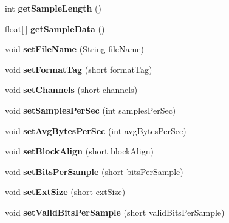 \begin{DoxyCompactItemize}
\item 
\hypertarget{classSample_af37225c7e2ac53d7e0e34a24e80dba47}{int {\bfseries get\-Sample\-Length} ()}\label{classSample_af37225c7e2ac53d7e0e34a24e80dba47}

\item 
\hypertarget{classSample_a97254a39cf9d058d845b044ed42dc11b}{float\mbox{[}$\,$\mbox{]} {\bfseries get\-Sample\-Data} ()}\label{classSample_a97254a39cf9d058d845b044ed42dc11b}

\item 
\hypertarget{classSample_abe334dfc32a4d11c31af3bee72b2f2c9}{void {\bfseries set\-File\-Name} (String file\-Name)}\label{classSample_abe334dfc32a4d11c31af3bee72b2f2c9}

\item 
\hypertarget{classSample_aee291be6b38d3bd3d73742793af93a6b}{void {\bfseries set\-Format\-Tag} (short format\-Tag)}\label{classSample_aee291be6b38d3bd3d73742793af93a6b}

\item 
\hypertarget{classSample_ac7771244e7a8c2908a6874d804814e60}{void {\bfseries set\-Channels} (short channels)}\label{classSample_ac7771244e7a8c2908a6874d804814e60}

\item 
\hypertarget{classSample_aca851b0629fb100b0a2bf32accfa4802}{void {\bfseries set\-Samples\-Per\-Sec} (int samples\-Per\-Sec)}\label{classSample_aca851b0629fb100b0a2bf32accfa4802}

\item 
\hypertarget{classSample_a0b67b42fb312f5e00c49eb73808f9804}{void {\bfseries set\-Avg\-Bytes\-Per\-Sec} (int avg\-Bytes\-Per\-Sec)}\label{classSample_a0b67b42fb312f5e00c49eb73808f9804}

\item 
\hypertarget{classSample_ab3db7004da9f3273b8e347ba9d259da9}{void {\bfseries set\-Block\-Align} (short block\-Align)}\label{classSample_ab3db7004da9f3273b8e347ba9d259da9}

\item 
\hypertarget{classSample_ab3ddcf6c25fc1816d70a538acbd70a2e}{void {\bfseries set\-Bits\-Per\-Sample} (short bits\-Per\-Sample)}\label{classSample_ab3ddcf6c25fc1816d70a538acbd70a2e}

\item 
\hypertarget{classSample_ae9b83df57a401fb5b06731548c388547}{void {\bfseries set\-Ext\-Size} (short ext\-Size)}\label{classSample_ae9b83df57a401fb5b06731548c388547}

\item 
\hypertarget{classSample_ac6c8c334524662c79fef9aab84699ee5}{void {\bfseries set\-Valid\-Bits\-Per\-Sample} (short valid\-Bits\-Per\-Sample)}\label{classSample_ac6c8c334524662c79fef9aab84699ee5}


\end{DoxyCompactItemize}
